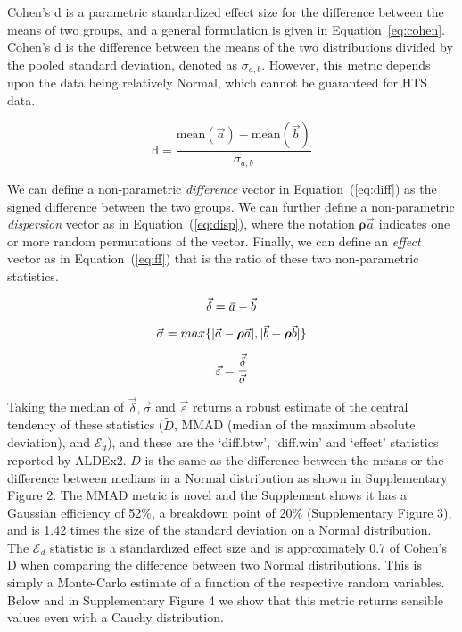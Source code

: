 Cohen's d is a parametric standardized effect size for the difference between the means of two groups, and a general formulation is given in Equation~\ref{eq:cohen}. Cohen's d is the difference between the means of the two distributions divided by the pooled standard deviation, denoted as \(\sigma_{a,b}\). However, this metric depends upon the data being relatively Normal, which cannot be guaranteed for HTS data. 

\begin{equation}
\mathrm{d} = \frac{\mathrm{mean}(\vec{a} )- \mathrm{mean}(\vec{b})}{\sigma_{a,b}}
\label{eq:cohen}
\end{equation}

We can define a non-parametric  \emph{difference} vector  in Equation~(\ref{eq:diff}) as the signed difference between the two groups. We can further define a non-parametric  \emph{dispersion} vector as in Equation~(\ref{eq:disp}), where the notation $\boldsymbol{\rho}\vec{a}$ indicates one or more random permutations of the vector. Finally, we can define an \emph{effect} vector as in Equation~(\ref{eq:ff}) that is the ratio of these two non-parametric statistics. 

\begin{equation}
\vec{\delta} = \vec{a} - \vec{b}
\label{eq:diff}\vspace*{-10pt}
\end{equation}

\begin{equation}
\vec{\sigma} = max \{ \lvert \vec{a} - \boldsymbol{\rho} \vec{a}  \rvert ,\lvert \vec{b} -\boldsymbol{\rho} \vec{b} \rvert \}
\label{eq:disp}\vspace*{-10pt}
\end{equation}

\begin{equation}
\vec{\varepsilon} = \frac{\vec{\delta}}{\vec{\sigma}}
\label{eq:ff}\vspace*{0pt}
\end{equation}

Taking the median of $\vec{\delta}, \vec{\sigma}$ and $\vec{\varepsilon}$ returns a robust estimate of the central tendency of these statistics ($\tilde{D}$, MMAD (median of the maximum absolute deviation), and $\mathcal{E}_{d}$), and these are the `diff.btw', `diff.win' and `effect' statistics reported by ALDEx2. $\tilde{D}$ is the same as the difference between the means or the difference between medians in a Normal distribution as shown in Supplementary Figure  2. The MMAD metric is novel and the Supplement shows it has a Gaussian efficiency of 52\%, a breakdown point of 20\% (Supplementary Figure 3), and is 1.42 times the size of the standard deviation on a Normal distribution. The $\mathcal{E}_{d}$ statistic is a standardized effect size and is approximately 0.7 of Cohen's D when comparing the difference between two Normal distributions.  This is simply a Monte-Carlo estimate of a function of the respective random variables. Below and in Supplementary Figure 4 we show that this metric returns sensible values even with a Cauchy distribution.
